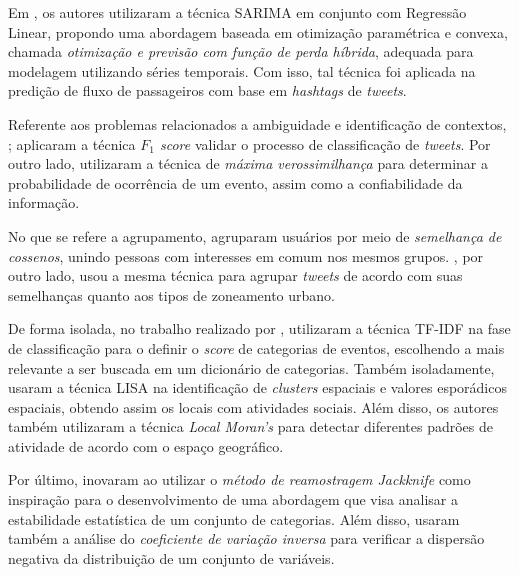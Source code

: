\documentclass[
	12pt,				%
	oneside,			%
	a4paper,			%
	english,			%
	brazil				%
	]{abntex2ppgsi}
\begin{document}
{{Em \cite{Ni2016}, os autores utilizaram a técnica SARIMA em conjunto com Regressão Linear, propondo uma abordagem baseada em otimização paramétrica e convexa, chamada \textit{otimização e previsão com função de perda híbrida}, adequada para modelagem utilizando séries temporais. Com isso, tal técnica foi aplicada na predição de fluxo de passageiros com base em \textit{hashtags} de \textit{tweets}.  

Referente aos problemas relacionados a ambiguidade e identificação de contextos, \cite{Anantharam2015}; \cite{Chen2016, Gal-Tzur2014} aplicaram a técnica \textit{${F_1}$ score} validar o processo de classificação de \textit{tweets}. Por outro lado, \cite{Mukherjee2015} utilizaram a técnica de \textit{máxima verossimilhança} para determinar a probabilidade de ocorrência de um evento, assim como a confiabilidade da informação.

No que se refere a agrupamento, \cite{Yousaf2014} agruparam usuários por meio de \textit{semelhança de cossenos}, unindo pessoas com interesses em comum nos mesmos grupos. \cite{Frias-Martinez2014}, por outro lado, usou a mesma técnica para agrupar \textit{tweets} de acordo com suas semelhanças quanto aos tipos de zoneamento urbano.

De forma isolada, no trabalho realizado por \cite{Mukherjee2015}, utilizaram a técnica TF-IDF na fase de classificação para o definir o \textit{score} de categorias de eventos, escolhendo a mais relevante a ser buscada em um dicionário de categorias. Também isoladamente, \cite{Steiger2015Census} usaram a técnica LISA na identificação de \textit{clusters} espaciais e valores esporádicos espaciais, obtendo assim os locais com atividades sociais. Além disso, os autores também utilizaram a técnica \textit{Local Moran's} para detectar diferentes padrões de atividade de acordo com o espaço geográfico.

Por último, \cite{Bendler2014} inovaram ao utilizar o \textit{método de reamostragem Jackknife} como inspiração para o desenvolvimento de uma abordagem que visa analisar a estabilidade estatística de um conjunto de categorias. Além disso, usaram também a análise do \textit{coeficiente de variação inversa} para verificar a dispersão negativa da distribuição de um conjunto de variáveis. 

}}
\end{document}
